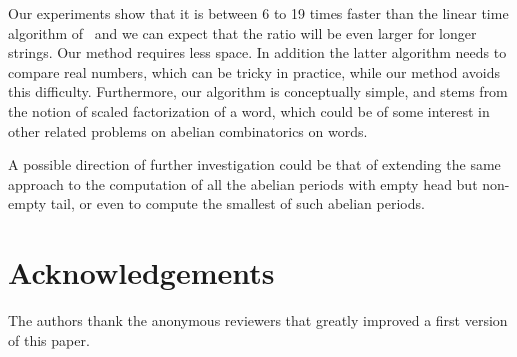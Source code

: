\documentclass[3p]{elsarticle}
\begin{document}
Our experiments show that it is between 6 to 19 times faster than the linear time algorithm of~\cite{KoRaRy13} and we can expect that the ratio will be even larger for longer strings.
Our method requires less space.
In addition the latter algorithm needs to compare real numbers, which can be tricky in practice, while
our method avoids this difficulty.
Furthermore, our algorithm is conceptually simple, and stems from the notion of scaled factorization of a word, which could be of some interest in other related problems on abelian combinatorics on words.

A possible direction of further investigation could be that of extending the same approach to the computation of all the abelian periods with empty head but non-empty tail, or even to compute the smallest of such abelian periods.

\section*{Acknowledgements}


The authors thank the anonymous reviewers that greatly improved a first version
 of this paper.        
\end{document}

